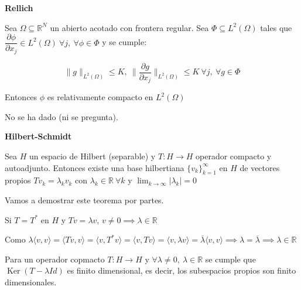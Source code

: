 \documentclass[openany]{book}
\begin{document}
\begin{theorem} \label{rellich}
    \textbf{Rellich}

    Sea $ \Omega  \subseteq  \mathbb{R}^{N}$ un abierto acotado con frontera regular. Sea $ \Phi \subseteq L^2(\Omega )$ tales que $ \dfrac{\partial \phi}{\partial x_j} \in L^2(\Omega ) \ \forall j, \ \forall \phi \in \Phi$ y se cumple:
    
    $$ \|g\|_{L^2(\Omega )} \leq  K,\ \| \dfrac{\partial g}{\partial x_j}\|_{L^2(\Omega )} \leq  K \ \forall j, \ \forall g \in \Phi $$

    Entonces $ \phi$ es relativamente compacto en $ L^2(\Omega )$

\end{theorem}

\begin{demonstration}
    No se ha dado (ni se pregunta).
\end{demonstration}

\begin{theorem}\label{hil-sch} \textbf{Hilbert-Schmidt}

    Sea $ H$ un espacio de Hilbert (separable) y $ T:H \to H$ operador compacto y autoadjunto. Entonces existe una base hilbertiana $ \{v_k\}_{k=1}^{\infty}$ en $ H$ de vectores propios $ Tv_k = \lambda _{k}v_k$ con $ \lambda_k \in \mathbb{R} \ \forall k $ y $ \lim_{k \to \infty}|\lambda _{k}| = 0$
\end{theorem}

Vamos a demostrar este teorema por partes.

\begin{proposition}
    Si $ T = T^* $ en $ H$ y $ Tv = \lambda  v$, $ v \ne 0 \implies \lambda  \in \mathbb{R}$
\end{proposition}

\begin{demonstration}
    Como  $ \lambda  \langle v, v \rangle = \langle Tv, v \rangle = \langle v, T^* v \rangle = \langle v,  Tv \rangle = \langle v, \lambda  v \rangle = \overline{\lambda } \langle v, v \rangle \implies \lambda  = \overline{\lambda } \implies \lambda \in \mathbb{R} $
\end{demonstration}

\begin{proposition}
    Para un operador copmacto $ T: H\to H$ y $ \forall \lambda  \ne 0,\ \lambda  \in \mathbb{R}$ se cumple que $ \operatorname{Ker}(T-\lambda Id)$ es finito dimensional, es decir, los subespacios propios son finito dimensionales.
\end{proposition}
\end{document}

